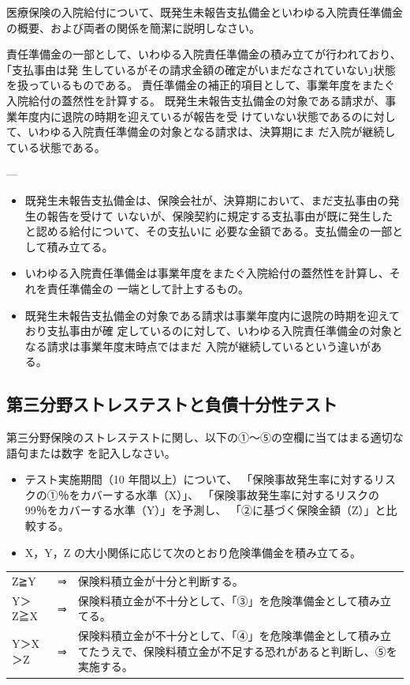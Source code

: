 \documentclass[report,gutter=10mm,fore-edge=10mm,uplatex,dvipdfmx]{jlreq}
\begin{document}
医療保険の入院給付について、既発生未報告支払備金といわゆる入院責任準備金の概要、および両者の関係を簡潔に説明しなさい。

責任準備金の一部として、いわゆる入院責任準備金の積み立てが行われており、｢支払事由は発
生しているがその請求金額の確定がいまだなされていない｣状態を扱っているものである。
責任準備金の補正的項目として、事業年度をまたぐ入院給付の蓋然性を計算する。
既発生未報告支払備金の対象である請求が、事業年度内に退院の時期を迎えているが報告を受
けていない状態であるのに対して、いわゆる入院責任準備金の対象となる請求は、決算期にま
だ入院が継続している状態である。

---
\begin{itemize}
 \item 既発生未報告支払備金は、保険会社が、決算期において、まだ支払事由の発生の報告を受けて
いないが、保険契約に規定する支払事由が既に発生したと認める給付について、その支払いに
必要な金額である。支払備金の一部として積み立てる。
 \item いわゆる入院責任準備金は事業年度をまたぐ入院給付の蓋然性を計算し、それを責任準備金の
一端として計上するもの。
 \item 既発生未報告支払備金の対象である請求は事業年度内に退院の時期を迎えており支払事由が確
定しているのに対して、いわゆる入院責任準備金の対象となる請求は事業年度末時点ではまだ
入院が継続しているという違いがある。
\end{itemize}


\subsection{第三分野ストレステストと負債十分性テスト}
第三分野保険のストレステストに関し、以下の①～⑤の空欄に当てはまる適切な語句または数字
を記入しなさい。
\begin{itemize}
 \item テスト実施期間（10 年間以上）について、
「保険事故発生率に対するリスクの①％をカバーする水準（X）」、
「保険事故発生率に対するリスクの 99％をカバーする水準（Y）」を予測し、
「②に基づく保険金額（Z）」と比較する。
 \item X，Y，Z の大小関係に応じて次のとおり危険準備金を積み立てる。
\end{itemize}

  \begin{tabularx}{\linewidth}[b]{lcX}
 Z≧Y&⇒ & 保険料積立金が十分と判断する。\\
 Y＞Z≧X& ⇒&保険料積立金が不十分として、「③」を危険準備金として積み立てる。\\
Y＞X＞Z &⇒&保険料積立金が不十分として、「④」を危険準備金として積み立てたうえで、保険料積立金が不足する恐れがあると判断し、⑤を実施する。\\
\end{tabularx}
\end{document}
